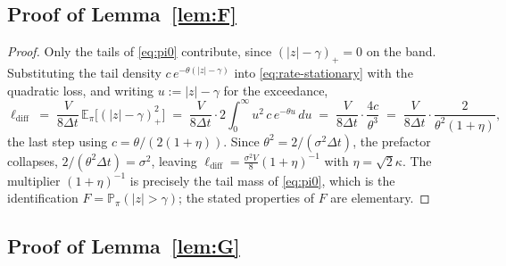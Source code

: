 \documentclass[runningheads]{llncs}
\newcommand{\E}{\mathbb{E}}
\newcommand{\Prob}{\mathbb{P}}
\newcommand{\dt}{\Delta t}
\newcommand{\1}{\mathbf{1}}
\begin{document}
\subsection{Proof of Lemma~\ref{lem:F}}\label{app:F}

\begin{proof}
Only the tails of \eqref{eq:pi0} contribute, since $(|z|-\gamma)_+ = 0$ on the band. Substituting the tail density $c\,e^{-\theta(|z|-\gamma)}$ into \eqref{eq:rate-stationary} with the quadratic loss, and writing $u := |z|-\gamma$ for the exceedance,
\[
\ell_{\mathrm{diff}} \;=\; \frac{V}{8\dt}\,\E_{\pi}\big[(|z|-\gamma)_+^2\big]
\;=\; \frac{V}{8\dt}\cdot 2\int_0^\infty u^2\,c\,e^{-\theta u}\,du
\;=\; \frac{V}{8\dt}\cdot\frac{4c}{\theta^3}
\;=\; \frac{V}{8\dt}\cdot\frac{2}{\theta^2(1+\eta)},
\]
the last step using $c=\theta/(2(1+\eta))$. Since $\theta^2 = 2/(\sigma^2\dt)$, the prefactor collapses, $2/(\theta^2\dt) = \sigma^2$, leaving
$\ell_{\mathrm{diff}} = \tfrac{\sigma^2V}{8}(1+\eta)^{-1}$ with $\eta=\sqrt2 \kappa$. The multiplier $(1+\eta)^{-1}$ is precisely the tail mass of \eqref{eq:pi0}, which is the identification $F = \Prob_\pi(|z|>\gamma)$; the stated properties of $F$ are elementary.
\end{proof}

\subsection{Proof of Lemma~\ref{lem:G}}\label{app:G}
\end{document}
